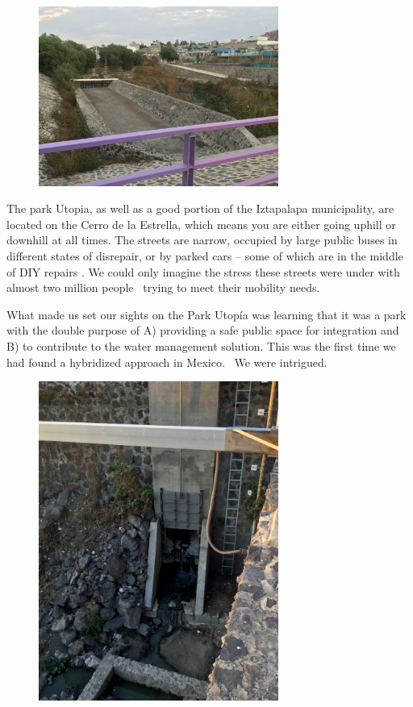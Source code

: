 \documentclass[letter]{ourGreenwayBrand}
\begin{document}
\begin{figure}[htbp]
  \centering
  \includegraphics[width=0.7\textwidth]{images/IMG_8120-1536x1152.jpg}
\end{figure}

The park Utopia, as well as a good portion of the Iztapalapa municipality, are located on the Cerro de la Estrella, which means you are either going uphill or downhill at all times. The streets are narrow, occupied by large public buses in different states of disrepair, or by parked cars – some of which are in the middle of DIY repairs . We could only imagine the stress these streets were under with almost two million people  trying to meet their mobility needs.

What made us set our sights on the Park Utopía was learning that it was a park with the double purpose of A) providing a safe public space for integration and B) to contribute to the water management solution. This was the first time we had found a hybridized approach in Mexico.  We were intrigued.

\begin{figure}[htbp]
  \centering
  \includegraphics[width=0.7\textwidth]{images/IMG_8074-1536x2048.jpg}
\end{figure}
\end{document}
